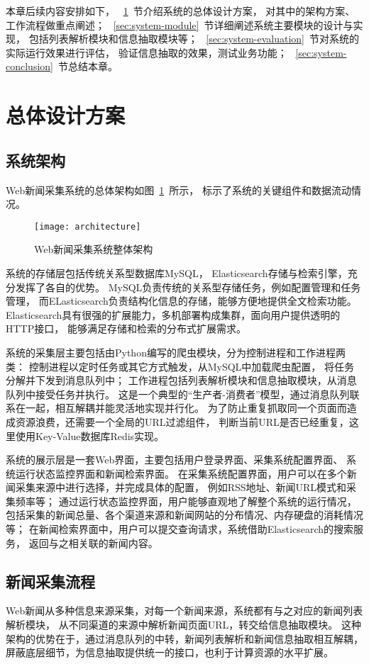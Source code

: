 本章后续内容安排如下，
~\ref{sec:system-architecture}~节介绍系统的总体设计方案，
对其中的架构方案、工作流程做重点阐述；
~\ref{sec:system-module}~节详细阐述系统主要模块的设计与实现，
包括列表解析模块和信息抽取模块等；
~\ref{sec:system-evaluation}~节对系统的实际运行效果进行评估，
验证信息抽取的效果，测试业务功能；
~\ref{sec:system-conclusion}~节总结本章。

\section{总体设计方案}
\label{sec:system-architecture}

\subsection{系统架构}
Web新闻采集系统的总体架构如图~\ref{fig:architecture}~所示，
标示了系统的关键组件和数据流动情况。

\begin{figure}[htbp]
\centering
\texttt{[image: architecture]}
\caption{Web新闻采集系统整体架构}
\label{fig:architecture}
\end{figure}

系统的存储层包括传统关系型数据库MySQL，
Elasticsearch存储与检索引擎，充分发挥了各自的优势。
MySQL负责传统的关系型存储任务，例如配置管理和任务管理，
而ELasticsearch负责结构化信息的存储，能够方便地提供全文检索功能。
Elasticsearch具有很强的扩展能力，多机部署构成集群，面向用户提供透明的HTTP接口，
能够满足存储和检索的分布式扩展需求。

系统的采集层主要包括由Python编写的爬虫模块，分为控制进程和工作进程两类：
控制进程以定时任务或其它方式触发，从MySQL中加载爬虫配置，
将任务分解并下发到消息队列中；
工作进程包括列表解析模块和信息抽取模块，从消息队列中接受任务并执行。
这是一个典型的“生产者-消费者”模型，通过消息队列联系在一起，相互解耦并能灵活地实现并行化。
为了防止重复抓取同一个页面而造成资源浪费，还需要一个全局的URL过滤组件，
判断当前URL是否已经重复，这里使用Key-Value数据库Redis实现。

系统的展示层是一套Web界面，主要包括用户登录界面、采集系统配置界面、
系统运行状态监控界面和新闻检索界面。
在采集系统配置界面，用户可以在多个新闻采集来源中进行选择，并完成具体的配置，
例如RSS地址、新闻URL模式和采集频率等；
通过运行状态监控界面，用户能够直观地了解整个系统的运行情况，
包括采集的新闻总量、各个渠道来源和新闻网站的分布情况、内存硬盘的消耗情况等；
在新闻检索界面中，用户可以提交查询请求，系统借助Elasticsearch的搜索服务，
返回与之相关联的新闻内容。

\subsection{新闻采集流程}
Web新闻从多种信息来源采集，对每一个新闻来源，系统都有与之对应的新闻列表解析模块，
从不同渠道的来源中解析新闻页面URL，转交给信息抽取模块。
这种架构的优势在于，通过消息队列的中转，新闻列表解析和新闻信息抽取相互解耦，
屏蔽底层细节，为信息抽取提供统一的接口，也利于计算资源的水平扩展。

